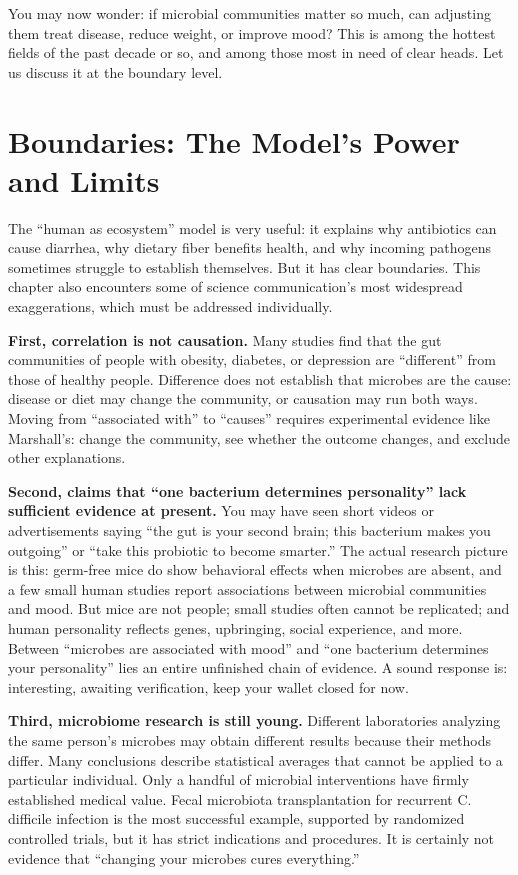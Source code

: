 You may now wonder: if microbial communities matter so much, can adjusting them treat disease, reduce weight, or improve mood? This is among the hottest fields of the past decade or so, and among those most in need of clear heads. Let us discuss it at the boundary level.

\section{Boundaries: The Model's Power and Limits}

The ``human as ecosystem'' model is very useful: it explains why antibiotics can cause diarrhea, why dietary fiber benefits health, and why incoming pathogens sometimes struggle to establish themselves. But it has clear boundaries. This chapter also encounters some of science communication's most widespread exaggerations, which must be addressed individually.

\textbf{First, correlation is not causation.} Many studies find that the gut communities of people with obesity, diabetes, or depression are ``different'' from those of healthy people. Difference does not establish that microbes are the cause: disease or diet may change the community, or causation may run both ways. Moving from ``associated with'' to ``causes'' requires experimental evidence like Marshall's: change the community, see whether the outcome changes, and exclude other explanations.

\textbf{Second, claims that ``one bacterium determines personality'' lack sufficient evidence at present.} You may have seen short videos or advertisements saying ``the gut is your second brain; this bacterium makes you outgoing'' or ``take this probiotic to become smarter.'' The actual research picture is this: germ-free mice do show behavioral effects when microbes are absent, and a few small human studies report associations between microbial communities and mood. But mice are not people; small studies often cannot be replicated; and human personality reflects genes, upbringing, social experience, and more. Between ``microbes are associated with mood'' and ``one bacterium determines your personality'' lies an entire unfinished chain of evidence. A sound response is: interesting, awaiting verification, keep your wallet closed for now.

\textbf{Third, microbiome research is still young.} Different laboratories analyzing the same person's microbes may obtain different results because their methods differ. Many conclusions describe statistical averages that cannot be applied to a particular individual. Only a handful of microbial interventions have firmly established medical value. Fecal microbiota transplantation for recurrent C. difficile infection is the most successful example, supported by randomized controlled trials, but it has strict indications and procedures. It is certainly not evidence that ``changing your microbes cures everything.''

